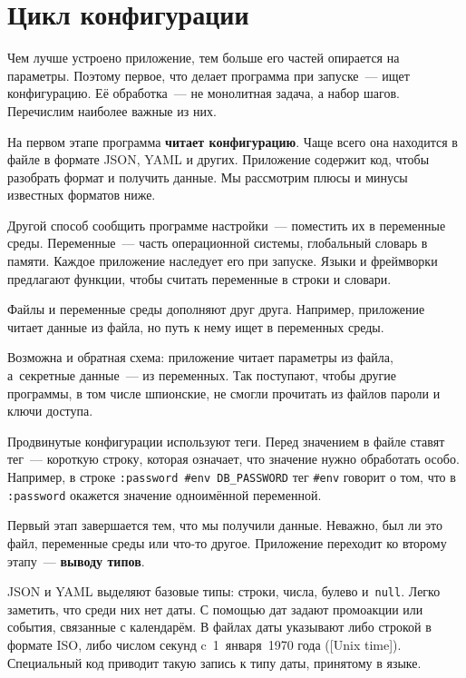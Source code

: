 \section{Цикл конфигурации}

Чем лучше устроено приложение, тем больше его частей опирается на параметры.
Поэтому первое, что делает программа при запуске~--- ищет конфигурацию. Её
обработка~--- не монолитная задача, а набор шагов. Перечислим наиболее важные из
них.

На первом этапе программа \textbf{читает конфигурацию}. Чаще всего она находится
в файле в формате JSON, YAML и других. Приложение содержит код, чтобы разобрать
формат и получить данные. Мы рассмотрим плюсы и минусы известных форматов ниже.

Другой способ сообщить программе настройки~--- поместить их в переменные среды.
Переменные~--- часть операционной системы, глобальный словарь в памяти. Каждое
приложение наследует его при запуске. Языки и фреймворки предлагают функции,
чтобы считать переменные в строки и словари.

Файлы и переменные среды дополняют друг друга. Например, приложение читает
данные из файла, но путь к нему ищет в переменных среды.

Возможна и обратная схема: приложение читает параметры из файла, а~секретные
данные~--- из переменных. Так поступают, чтобы другие программы, в том числе
шпионские, не смогли прочитать из файлов пароли и ключи доступа.


Продвинутые конфигурации используют теги. Перед значением в файле ставят тег~---
короткую строку, которая означает, что значение нужно обработать особо.
Например, в строке \verb|:password #env DB_PASSWORD| тег \verb|#env| говорит о
том, что в \verb|:password| окажется значение одноимённой переменной.

Первый этап завершается тем, что мы получили данные. Неважно, был ли это файл,
переменные среды или что-то другое. Приложение переходит ко второму этапу~---
\textbf{выводу типов}.


JSON и YAML выделяют базовые типы: строки, числа, булево и~\verb|null|. Легко
заметить, что среди них нет даты. С помощью дат задают промоакции или события,
связанные с календарём. В файлах даты указывают либо строкой в формате ISO, либо
числом секунд c~1~января~1970 года ([Unix time]).
Специальный код приводит такую запись к типу даты, принятому в языке.


